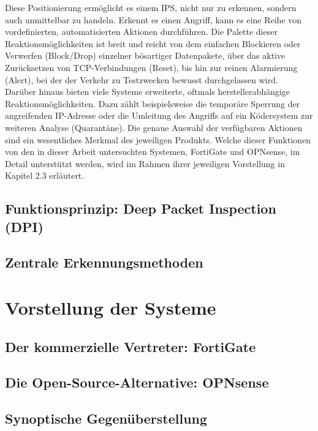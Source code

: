 Diese Positionierung ermöglicht es einem IPS, nicht nur zu erkennen, sondern auch unmittelbar zu handeln. Erkennt es einen Angriff, kann es eine Reihe von vordefinierten, automatisierten Aktionen durchführen. Die Palette dieser Reaktionsmöglichkeiten ist breit und reicht von dem einfachen Blockieren oder Verwerfen (Block/Drop) einzelner bösartiger Datenpakete, über das aktive Zurücksetzen von TCP-Verbindungen (Reset), bis hin zur reinen Alarmierung (Alert), bei der der Verkehr zu Testzwecken bewusst durchgelassen wird.\cite{Suricata1, NIST1}\\

Darüber hinaus bieten viele Systeme erweiterte, oftmals herstellerabhängige Reaktionsmöglichkeiten. Dazu zählt beispielsweise die temporäre Sperrung der angreifenden IP-Adresse oder die Umleitung des Angriffs auf ein Ködersystem zur weiteren Analyse (Quarantäne). Die genaue Auswahl der verfügbaren Aktionen sind ein wesentliches Merkmal des jeweiligen Produkts. Welche dieser Funktionen von den in dieser Arbeit untersuchten Systemen, FortiGate und OPNsense, im Detail unterstützt werden, wird im Rahmen ihrer jeweiligen Vorstellung in Kapitel 2.3 erläutert.
\subsection{Funktionsprinzip: Deep Packet Inspection (DPI)}
\subsection{Zentrale Erkennungsmethoden}

\section{Vorstellung der Systeme}
\subsection{Der kommerzielle Vertreter: FortiGate}
\subsection{Die Open-Source-Alternative: OPNsense}
\subsection{Synoptische Gegenüberstellung}